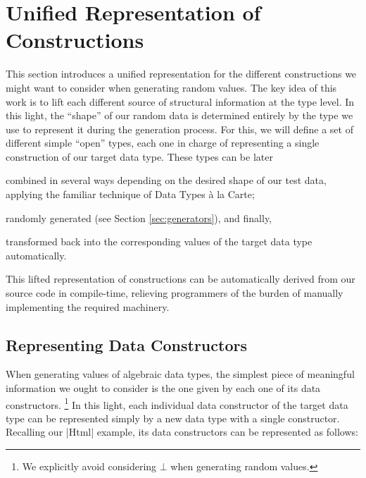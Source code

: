 \section{Unified Representation of Constructions}
\label{sec:representation}

%
This section introduces a unified representation for the different constructions
we might want to consider when generating random values.
%
The key idea of this work is to lift each different source of structural
information at the type level.
%
In this light, the ``shape'' of our random data is determined entirely by the
type we use to represent it during the generation process.
%
For this, we will define a set of different simple ``open'' types, each one in
charge of representing a single construction of our target data type.
%
These types can be later
%
\begin{inparaenum}[(i)]
\item combined in several ways depending on the desired shape of our test data,
  applying the familiar technique of Data Types \`a la Carte;
\item randomly generated (see Section \ref{sec:generators}), and finally,
\item transformed back into the corresponding values of the target data type
  automatically.
\end{inparaenum}
%
This lifted representation of constructions can be automatically derived from
our source code in compile-time, relieving programmers of the burden of manually
implementing the required machinery.


%
\subsection{Representing Data Constructors}

When generating values of algebraic data types, the simplest piece of meaningful
information we ought to consider is the one given by each one of its data
constructors.
%
\footnote{We explicitly avoid considering $\bot$ when generating random values.}
%
In this light, each individual data constructor of the target data type can be
represented simply by a new data type with a single constructor.
%
Recalling our |Html| example, its data constructors can be represented as
follows:

